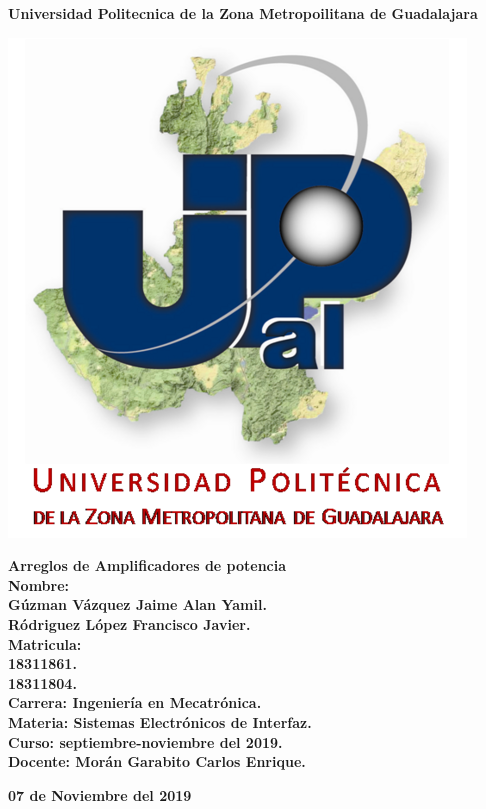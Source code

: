 \documentclass[12pt,a4paper]{article}
\author{Rodriguez Lopez Francisco Javier}
\begin{document}
\begin{center}
\LARGE \textbf{Universidad Politecnica de la Zona Metropoilitana de Guadalajara\\}

\includegraphics[scale=1]{Upzmg6.png} 

\large \textbf{Arreglos de Amplificadores de potencia}\\
\vspace{2cm}
\large \textbf{Nombre:\\
Gúzman Vázquez Jaime Alan Yamil.\\
Ródriguez López Francisco Javier.\\
\vspace{0.5cm} Matricula:\\
18311861.\\
18311804.\\
\vspace{0.5cm} Carrera: Ingeniería en Mecatrónica.\\
\vspace{0.5cm} Materia: Sistemas Electrónicos de Interfaz.\\
\vspace{0.5cm} Curso: septiembre-noviembre del 2019.\\
\vspace{0.5cm} Docente: Morán Garabito Carlos Enrique.}


\vspace{3cm}
\small \textbf{07 de Noviembre del 2019}
\end{center}
\end{document}
